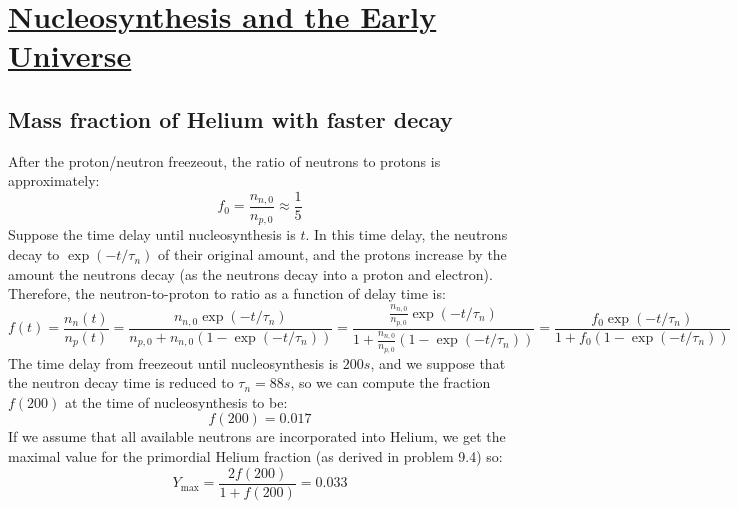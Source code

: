 \section[Nucleosynthesis and the Early Universe]{\hyperlink{toc}{Nucleosynthesis and the Early Universe}}

\subsection{Mass fraction of Helium with faster decay}
After the proton/neutron freezeout, the ratio of neutrons to protons is approximately:
\begin{equation}
    f_0 = \frac{n_{n, 0}}{n_{p, 0}} \approx \frac{1}{5}
\end{equation}
Suppose the time delay until nucleosynthesis is $t$. In this time delay, the neutrons decay to $\exp(-t/\tau_n)$ of their original amount, and the protons increase by the amount the neutrons decay (as the neutrons decay into a proton and electron). Therefore, the neutron-to-proton to ratio as a function of delay time is:
\begin{equation}\label{ntop}
    f(t) = \frac{n_n(t)}{n_p(t)} = \frac{n_{n, 0}\exp(-t/\tau_n)}{n_{p, 0} + n_{n, 0}(1 - \exp(-t/\tau_n))} = \frac{\frac{n_{n, 0}}{n_{p, 0}}\exp(-t/\tau_n)}{1 + \frac{n_{n, 0}}{n_{p, 0}}(1 - \exp(-t/\tau_n))} = \frac{f_0\exp(-t/\tau_n)}{1 + f_0(1 - \exp(-t/\tau_n))}
\end{equation}
The time delay from freezeout until nucleosynthesis is $200\si{s}$, and we suppose that the neutron decay time is reduced to $\tau_n = 88\si{s}$, so we can compute the fraction $f(200)$ at the time of nucleosynthesis to be:
\begin{equation}
    f(200) = 0.017
\end{equation}
If we assume that all available neutrons are incorporated into Helium, we get the maximal value for the primordial Helium fraction (as derived in problem 9.4) so:
\begin{equation}
    \boxed{Y_{\text{max}} = \frac{2f(200)}{1+f(200)} = 0.033}
\end{equation}

